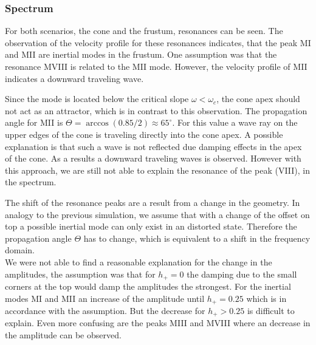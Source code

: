 \subsubsection{Spectrum}

For both scenarios, the cone and the frustum, resonances can be seen.
The observation of the velocity profile for these resonances indicates,
that the peak M\RN{1} and M\RN{2} are inertial modes in the frustum.
One assumption was that the resonance M\RN{8} is related to the M\RN{2} mode.
However, the velocity profile of M\RN{2} indicates a downward traveling wave.

Since the mode is located below the critical slope $\omega < \omega_c$, the cone apex
should not act as an attractor, which is in contrast to this observation.
The propagation angle for M\RN{2} is $\Theta=\arccos(0.85/2)\approx65^\circ$.
For this value a wave ray on the upper edges of the cone is traveling directly
into the cone apex.
A possible explanation is that such a wave is not reflected due damping effects in
the apex of the cone. As a results a downward traveling waves is observed.
However with this approach, we are still not able to explain the resonance of the peak (\RN{8}),
in the spectrum.

The shift of the resonance peaks are a result from a change in the geometry.
In analogy to the previous simulation, we assume that with a change of the offset on top
a possible inertial mode can only exist in an distorted state.
Therefore the propagation angle $\Theta$ has to change,
which is equivalent to a shift in the frequency domain.\\
We were not able to find a reasonable explanation for the change in the amplitudes,
the assumption was that for $h_+=0$ the damping due to the small corners at the top
would damp the amplitudes the strongest.
For the inertial modes M\RN{1} and M\RN{2} an increase of the amplitude until $h_+=0.25$
which is in accordance with the assumption.
But the decrease for $h_+>0.25$ is difficult to explain.
Even more confusing are  the peaks M\RN{3} and M\RN{8} where an decrease in the amplitude
can be observed.

